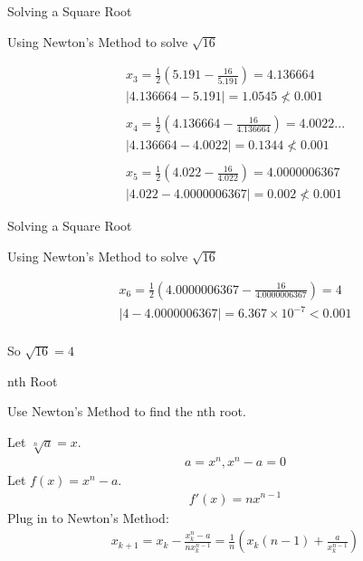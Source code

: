 \documentclass[aspectratio=169,xcolor=dvipsnames]{beamer}
\begin{document}
\begin{frame}{Solving a Square Root}
    \begin{center}
        Using Newton's Method to solve $\sqrt{16}$
    \end{center}
    \begin{gather*}
        x_{3} = \frac{1}{2}\left( 5.191 - \frac{16}{5.191} \right) = 4.136664 \\
        |4.136664 - 5.191| = 1.0545 \nless 0.001 \\ \\
        x_{4} = \frac{1}{2}\left( 4.136664 - \frac{16}{4.136664} \right) = 4.0022... \\
        |4.136664 - 4.0022| = 0.1344 \nless 0.001 \\ \\
        x_{5} = \frac{1}{2}\left( 4.022 - \frac{16}{4.022} \right) = 4.0000006367 \\
        |4.022 - 4.0000006367| = 0.002 \nless 0.001
    \end{gather*}
\end{frame}

\begin{frame}{Solving a Square Root}
    \begin{center}
        Using Newton's Method to solve $\sqrt{16}$
    \end{center}
    \begin{gather*}
        x_{6} = \frac{1}{2}\left( 4.0000006367 - \frac{16}{4.0000006367} \right) = 4 \\
        |4 - 4.0000006367| = 6.367\times10^{-7} < 0.001 \\
    \end{gather*}
    \begin{center}
        So $\sqrt{16} = 4$
    \end{center}
\end{frame}

\begin{frame}{nth Root}
    \begin{center}
        Use Newton's Method to find the nth root. \\
    \end{center}
    Let $\sqrt[n]{a} = x$.
    \begin{gather*}
        a = x^n, x^n - a = 0
    \end{gather*}
    Let $f(x) = x^n - a$.
    \begin{gather*}
        f'(x) = nx^{n-1}
    \end{gather*}
    Plug in to Newton's Method:
    \begin{gather*}
        x_{k+1} = x_k - \frac{x_k^n - a}{nx_k^{n-1}} = \frac{1}{n} \left( x_k(n-1)+\frac{a}{x_k^{n-1}} \right) \\
    \end{gather*}
\end{frame}
\end{document}
